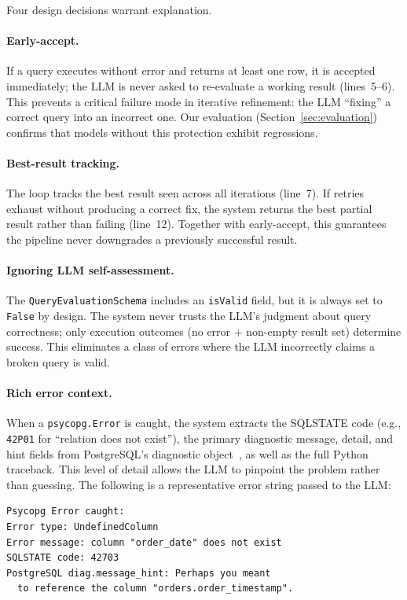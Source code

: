 \documentclass{article}
\begin{document}
Four design decisions warrant explanation.

\paragraph{Early-accept.} If a query executes without error and returns at least one row, it is accepted immediately; the LLM is never asked to re-evaluate a working result (lines~5--6). This prevents a critical failure mode in iterative refinement: the LLM ``fixing'' a correct query into an incorrect one. Our evaluation (Section~\ref{sec:evaluation}) confirms that models without this protection exhibit regressions.

\paragraph{Best-result tracking.} The loop tracks the best result seen across all iterations (line~7). If retries exhaust without producing a correct fix, the system returns the best partial result rather than failing (line~12). Together with early-accept, this guarantees the pipeline never downgrades a previously successful result.

\paragraph{Ignoring LLM self-assessment.} The \texttt{QueryEvaluationSchema} includes an \texttt{isValid} field, but it is always set to \texttt{False} by design. The system never trusts the LLM's judgment about query correctness; only execution outcomes (no error + non-empty result set) determine success. This eliminates a class of errors where the LLM incorrectly claims a broken query is valid.

\paragraph{Rich error context.} When a \texttt{psycopg.Error} is caught, the system extracts the SQLSTATE code (e.g., \texttt{42P01} for ``relation does not exist''), the primary diagnostic message, detail, and hint fields from PostgreSQL's diagnostic object~\citep{psycopg3}, as well as the full Python traceback. This level of detail allows the LLM to pinpoint the problem rather than guessing. The following is a representative error string passed to the LLM:

\begin{lstlisting}[basicstyle=\ttfamily\footnotesize, frame=single, breaklines=true]
Psycopg Error caught:
Error type: UndefinedColumn
Error message: column "order_date" does not exist
SQLSTATE code: 42703
PostgreSQL diag.message_hint: Perhaps you meant
  to reference the column "orders.order_timestamp".
\end{lstlisting}
\end{document}
